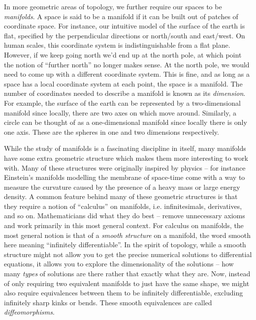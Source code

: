 In more geometric areas of topology, we further require our spaces to be \emph{manifolds}.
A space is said to be a manifold if it can be built out of patches of coordinate space. For instance, our intuitive model of the surface of the earth is flat, specified by the perpendicular directions or north/south and east/west. On human scales, this coordinate system is indistinguishable from a flat plane. However, if we keep going north we'd end up at the north pole, at which point the notion of ``further north'' no longer makes sense. At the north pole, we would need to come up with a different coordinate system. This is fine, and as long as a space has a local coordinate system at each point, the space is a manifold. The number of coordinates needed to describe a manifold is known as its \emph{dimension}. For example, the surface of the earth can be represented by a two-dimensional manifold since locally, there are two axes on which move around. Similarly, a circle can be thought of as a one-dimensional manifold since locally there is only one axis. These are the spheres in one and two dimensions respectively.

While the study of manifolds is a fascinating discipline in itself, many manifolds have some extra geometric structure which makes them more interesting to work with. Many of these structures were originally inspired by physics -- for instance Einstein's manifolds modelling the membrane of space-time come with a way to measure the curvature caused by the presence of a heavy mass or large energy density.
A common feature behind many of these geometric structures is that they require a notion of ``calculus'' on manifolds, i.e. infinitesimals, derivatives, and so on. Mathematicians did what they do best -- remove unnecessary axioms and work primarily in this most general context. For calculus on manifolds, the most general notion is that of a \emph{smooth structure} on a manifold, the word smooth here meaning ``infinitely differentiable''. In the spirit of topology, while a smooth structure might not allow you to get the precise numerical solutions to differential equations, it allows you to explore the dimensionality of the solutions -- how many \emph{types} of solutions are there rather that exactly what they are. Now, instead of only requiring two equivalent manifolds to just have the same shape, we might also require equivalences between them to be infinitely differentiable, excluding infinitely sharp kinks or bends. These smooth equivalences are called \emph{diffeomorphisms}.

